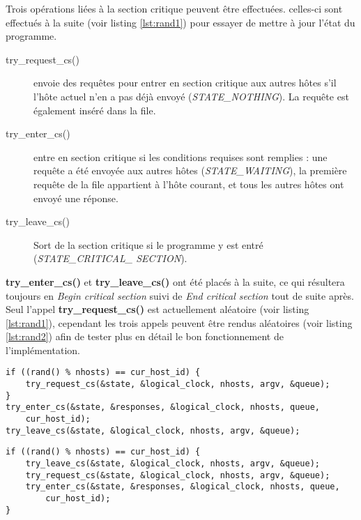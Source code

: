 Trois opérations liées à la section critique peuvent être effectuées. celles-ci sont effectués à la suite (voir listing \ref{lst:rand1}) pour essayer de mettre à jour l'état du programme.\\

\begin{description}
    \item[try\_request\_cs()] envoie des requêtes pour entrer en section critique aux autres hôtes s'il l'hôte actuel n'en a pas déjà envoyé (\emph{STATE\_NOTHING}). La requête est également inséré dans la file.

    \item[try\_enter\_cs()] entre en section critique si les conditions requises sont remplies : une requête a été envoyée aux autres hôtes (\emph{STATE\_WAITING}), la première requête de la file appartient à l'hôte courant, et tous les autres hôtes ont envoyé une réponse.

    \item[try\_leave\_cs()] Sort de la section critique si le programme y est entré (\emph{STATE\_CRITICAL\_ SECTION}).
\end{description}

\begin{framehint}
\textbf{try\_enter\_cs()} et \textbf{try\_leave\_cs()} ont été placés à la suite, ce qui résultera toujours en \emph{Begin critical section} suivi de \emph{End critical section} tout de suite après. Seul l'appel \textbf{try\_request\_cs()} est actuellement aléatoire (voir listing \ref{lst:rand1}), cependant les trois appels peuvent être rendus aléatoires (voir listing \ref{lst:rand2}) afin de tester plus en détail le bon fonctionnement de l'implémentation.\\

\begin{lstlisting}[label={lst:rand1}, caption={Changement d'état aléatoire 1}, numbers=none]
if ((rand() % nhosts) == cur_host_id) {
    try_request_cs(&state, &logical_clock, nhosts, argv, &queue);
}
try_enter_cs(&state, &responses, &logical_clock, nhosts, queue,
    cur_host_id);
try_leave_cs(&state, &logical_clock, nhosts, argv, &queue);
\end{lstlisting}

\begin{lstlisting}[label={lst:rand2}, caption={Changement d'état aléatoire 2}, numbers=none]
if ((rand() % nhosts) == cur_host_id) {
    try_leave_cs(&state, &logical_clock, nhosts, argv, &queue);
    try_request_cs(&state, &logical_clock, nhosts, argv, &queue);
    try_enter_cs(&state, &responses, &logical_clock, nhosts, queue,
        cur_host_id);
}
\end{lstlisting}
\end{framehint}

